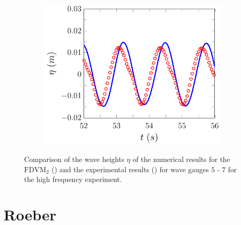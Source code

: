 \begin{figure}
	\begin{subfigure}{0.5\textwidth}
		\includegraphics[width=\textwidth]{./chp6/figures/Experiment/Beji/sh/FDVMWG7.pdf}
		\vspace{0.5cm}
	\end{subfigure}
	\caption{Comparison of the wave heights $\eta$ of the numerical results for the $\text{FDVM}_2$ ({\color{blue}\solidrule}) and the experimental results () for wave gauges $5$ - $7$ for the high frequency experiment.}
	\label{fig:BejishWG5to7FDVM}
\end{figure}

\section{Roeber}








